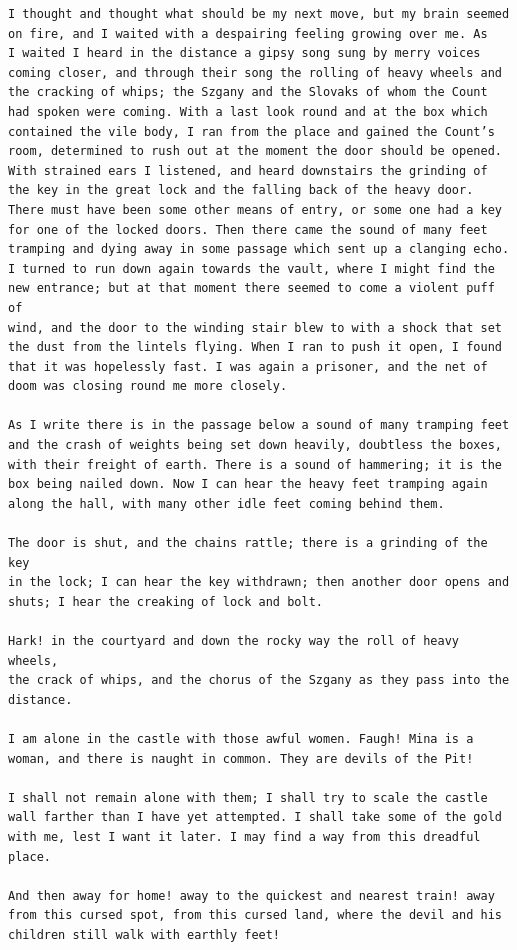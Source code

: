 \documentclass{article}
\begin{document}
\begin{verbatim}
I thought and thought what should be my next move, but my brain seemed
on fire, and I waited with a despairing feeling growing over me. As
I waited I heard in the distance a gipsy song sung by merry voices
coming closer, and through their song the rolling of heavy wheels and
the cracking of whips; the Szgany and the Slovaks of whom the Count
had spoken were coming. With a last look round and at the box which
contained the vile body, I ran from the place and gained the Count’s
room, determined to rush out at the moment the door should be opened.
With strained ears I listened, and heard downstairs the grinding of
the key in the great lock and the falling back of the heavy door.
There must have been some other means of entry, or some one had a key
for one of the locked doors. Then there came the sound of many feet
tramping and dying away in some passage which sent up a clanging echo.
I turned to run down again towards the vault, where I might find the
new entrance; but at that moment there seemed to come a violent puff of
wind, and the door to the winding stair blew to with a shock that set
the dust from the lintels flying. When I ran to push it open, I found
that it was hopelessly fast. I was again a prisoner, and the net of
doom was closing round me more closely.

As I write there is in the passage below a sound of many tramping feet
and the crash of weights being set down heavily, doubtless the boxes,
with their freight of earth. There is a sound of hammering; it is the
box being nailed down. Now I can hear the heavy feet tramping again
along the hall, with many other idle feet coming behind them.

The door is shut, and the chains rattle; there is a grinding of the key
in the lock; I can hear the key withdrawn; then another door opens and
shuts; I hear the creaking of lock and bolt.

Hark! in the courtyard and down the rocky way the roll of heavy wheels,
the crack of whips, and the chorus of the Szgany as they pass into the
distance.

I am alone in the castle with those awful women. Faugh! Mina is a
woman, and there is naught in common. They are devils of the Pit!

I shall not remain alone with them; I shall try to scale the castle
wall farther than I have yet attempted. I shall take some of the gold
with me, lest I want it later. I may find a way from this dreadful
place.

And then away for home! away to the quickest and nearest train! away
from this cursed spot, from this cursed land, where the devil and his
children still walk with earthly feet!


\end{verbatim}
\end{document}
